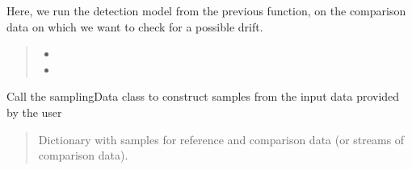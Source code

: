 \documentclass[letterpaper,10pt,english]{sphinxmanual}
\begin{document}
\begin{fulllineitems}
\begin{fulllineitems}
\end{fulllineitems}


\begin{fulllineitems}
\label{\detokenize{alibiModules/onlineDetectors:onlineDetectors.onlineDetectors.run}}
\pysigstartsignatures
{}
\pysigstopsignatures
\sphinxAtStartPar
Here, we run the detection model from the previous function, on the comparison data on
which we want to check for a possible drift.
\begin{quote}\begin{description}
\sphinxAtStartPar
\begin{itemize}
\item {} 
\sphinxAtStartPar
{}

\item {} 
\sphinxAtStartPar
{}

\end{itemize}


\end{description}\end{quote}

\end{fulllineitems}


\begin{fulllineitems}
\label{\detokenize{alibiModules/onlineDetectors:onlineDetectors.onlineDetectors.sampleData}}
\pysigstartsignatures
{}
\pysigstopsignatures
\sphinxAtStartPar
Call the samplingData class to construct samples from the input data provided by the user
\begin{quote}\begin{description}
\sphinxAtStartPar
Dictionary with samples for reference and comparison data (or streams of comparison data).

\end{description}\end{quote}

\end{fulllineitems}


\end{fulllineitems}
\end{document}
